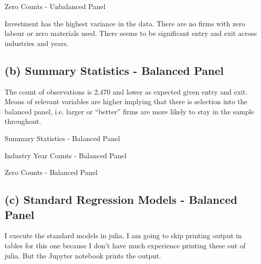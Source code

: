 \documentclass[11pt]{article}
\begin{document}
\begin{table}[ht]
    \centering
    \setlength{\tabcolsep}{1pt} %
\renewcommand{\arraystretch}{1.2}
    
    \caption{Zero Counts - Unbalanced Panel}
    \label{tab:zeros1}
\end{table}

Investment has the highest variance in the data. 
There are no firms with zero labour or zero materials used. 
There seems to be significant entry and exit across industries and years. 

\subsection*{(b) Summary Statistics - Balanced Panel}

The count of observations is 2,470 and lower as expected given entry and exit. 
Means of relevant variables are higher implying that there is selection into the balanced panel, i.e. larger or ``better'' firms are more likely to stay in the sample throughout.
\begin{table}[ht]
    \centering
    \setlength{\tabcolsep}{4pt} %
\renewcommand{\arraystretch}{1.2}
    
    \caption{Summary Statistics - Balanced Panel}
    \label{tab:summary_statistics2}
\end{table}

\begin{table}[ht]
    \centering
    \setlength{\tabcolsep}{2pt} %
\renewcommand{\arraystretch}{1.2}
    
    \caption{Industry Year Counts - Balanced Panel}
    \label{tab:ind_year2}
\end{table}


\begin{table}[ht]
    \centering
    \setlength{\tabcolsep}{1pt} %
\renewcommand{\arraystretch}{1.2}
    
    \caption{Zero Counts - Balanced Panel}
    \label{tab:zeros2}
\end{table}

\clearpage
\subsection*{(c) Standard Regression Models - Balanced Panel}

I execute the standard models in julia. 
I am going to skip printing output in tables for this one because I don't have much experience printing these out of julia. 
But the Jupyter notebook prints the output. 
\end{document}
